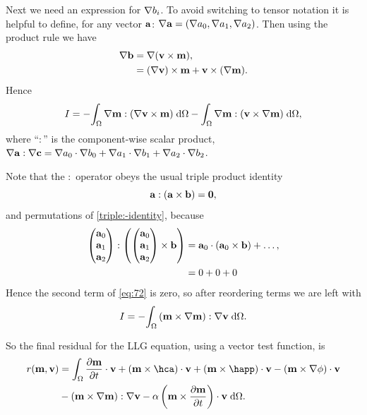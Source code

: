 Next we need an expression for $\nabla b_i$.
To avoid switching to tensor notation it is helpful to define, for any vector ${\mathbf{a}}$: $\nabla {\mathbf{a}} = (\nabla a_0, \nabla a_1, \nabla a_2)$.
Then using the product rule we have
\begin{equation}
  \begin{aligned}
    \nabla {\mathbf{b}} &= \nabla {\left( \mathbf{v}\times \mathbf{m}\right)}, \\
    & = (\nabla \mathbf{v}) \times \mathbf{m} + \mathbf{v} \times (\nabla \mathbf{m}).
  \end{aligned}
\end{equation}
Hence
\begin{equation}
  I = - {\int_{\Omega} {\nabla \mathbf{m} : {\left( \nabla \mathbf{v} \times \mathbf{m} \right)}} {\; \mathrm{{d}}} {\Omega}} 
      - {\int_{\Omega} {\nabla \mathbf{m} : {\left( \mathbf{v} \times \nabla \mathbf{m} \right)}} {\; \mathrm{{d}}} {\Omega}},
      \label{eq:72}
\end{equation}
where ``$:$'' is the component-wise scalar product, \eg $\nabla {\mathbf{a}} : \nabla {\mathbf{c}} = \nabla a_0 \cdot \nabla b_0 + \nabla a_1 \cdot \nabla b_1 + \nabla a_2 \cdot \nabla b_2$.

Note that the $:$ operator obeys the usual triple product identity
\begin{equation}
  {\mathbf{a}} : ({\mathbf{a}} \times {\mathbf{b}}) = \mathbf{0},
  \label{triple:-identity}
\end{equation}
and permutations of \cref{triple:-identity}, because
\begin{equation}
  \begin{aligned} 
    \begin{pmatrix} {\mathbf{a}}_0 \\ {\mathbf{a}}_1 \\ {\mathbf{a}}_2 \end{pmatrix} : {\left( \begin{pmatrix} {\mathbf{a}}_0 \\ {\mathbf{a}}_1 \\ {\mathbf{a}}_2 \end{pmatrix} \times {\mathbf{b}} \right)} &= {\mathbf{a}}_0 \cdot ({\mathbf{a}}_0 \times {\mathbf{b}}) + \ldots, \\
    & = 0 + 0 + 0
  \end{aligned}
\end{equation}
Hence the second term of \cref{eq:72} is zero, so after reordering terms we are left with
\begin{equation}
  \label{eq:final-lap-residual}
  I = - {\int_{\Omega} {{\left( \mathbf{m} \times \nabla \mathbf{m} \right)} : \nabla \mathbf{v}} {\; \mathrm{{d}}} {\Omega}}.
\end{equation}

So the final residual for the LLG equation, using a vector test function, is
\begin{equation}
  \begin{aligned}
    \label{eq:llg-res-final}
    \rllg(\mv, \testv) &= \int_\magd \dmdt\cdot \testv
    + (\mv \times \hca)\cdot \testv 
    + (\mv \times \happ)\cdot \testv 
    - (\mv \times \nabla \phi)\cdot \testv \\
    & - \bigb{\mv \times \grad \mv} : \grad \testv
    - \dampc \left( \mv \times \dmdt \right)\cdot \testv
    \d\magd.
  \end{aligned}
\end{equation}

